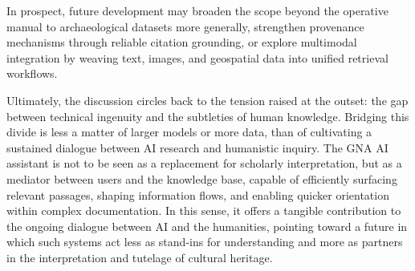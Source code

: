 \begin{spacing}{1.5}
In prospect, future development may broaden the scope beyond the operative manual to archaeological datasets more generally, strengthen provenance mechanisms through reliable citation grounding, or explore multimodal integration by weaving text, images, and geospatial data into unified retrieval workflows.

Ultimately, the discussion circles back to the tension raised at the outset: the gap between technical ingenuity and the subtleties of human knowledge. Bridging this divide is less a matter of larger models or more data, than of cultivating a sustained dialogue between AI research and humanistic inquiry. The GNA AI assistant is not to be seen as a replacement for scholarly interpretation, but as a mediator between users and the knowledge base, capable of efficiently surfacing relevant passages, shaping information flows, and enabling quicker orientation within complex documentation. In this sense, it offers a tangible contribution to the ongoing dialogue between AI and the humanities, pointing toward a future in which such systems act less as stand-ins for understanding and more as partners in the interpretation and tutelage of cultural heritage.

\end{spacing}